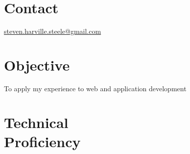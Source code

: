 \documentclass[margin,line]{resume}
\begin{document}
\begin{resume}

\vspace{1em}

\section{\mysidestyle Contact}

\href{mailto:steven.harville.steele@gmail.com}{steven.harville.steele@gmail.com}


\section{\mysidestyle Objective}


	To apply my experience to web and application development






\section{\mysidestyle Technical\\Proficiency}


\end{resume}
\end{document}
